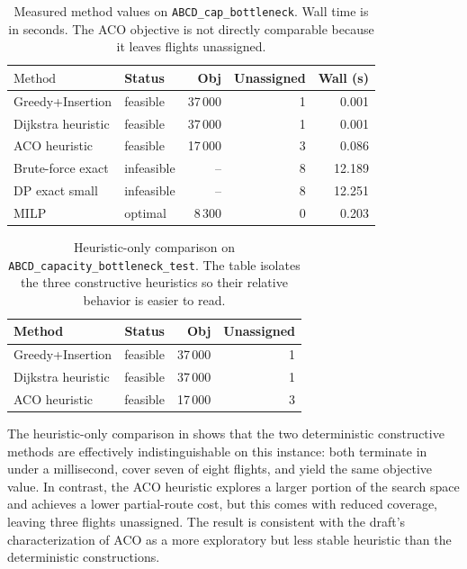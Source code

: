 \begin{table}[t]
\centering\small
\caption{Measured method values on \texttt{ABCD\_cap\_bottleneck}.
  Wall time is in seconds.  The ACO objective is not directly
  comparable because it leaves flights unassigned.}
\label{tab:heu_benchmark}
\begin{tabular}{l l r r r}
\toprule
$\text{Method}$ & Status & Obj & Unassigned & Wall (s) \\
\midrule
Greedy+Insertion & feasible & 37\,000 & 1 & 0.001 \\
Dijkstra heuristic & feasible & 37\,000 & 1 & 0.001 \\
ACO heuristic & feasible & 17\,000 & 3 & 0.086 \\
Brute-force exact & infeasible & -- & 8 & 12.189 \\
DP exact small & infeasible & -- & 8 & 12.251 \\
MILP & optimal & 8\,300 & 0 & 0.203 \\
\bottomrule
\end{tabular}
\end{table}

\begin{table}[t]
\centering\small
\caption{Heuristic-only comparison on
  \texttt{ABCD\_capacity\_bottleneck\_test}.  The table isolates the three
  constructive heuristics so their relative behavior is easier to read.}
\label{tab:heuristic_only}
\begin{tabular}{l r r r}
\toprule
Method & Status & Obj & Unassigned \\
\midrule
Greedy+Insertion & feasible & 37\,000 & 1 \\
Dijkstra heuristic & feasible & 37\,000 & 1 \\
ACO heuristic & feasible & 17\,000 & 3 \\
\bottomrule
\end{tabular}
\end{table}

The heuristic-only comparison in  shows that the two
deterministic constructive methods are effectively indistinguishable on this
instance: both terminate in under a millisecond, cover seven of eight flights,
and yield the same objective value.  In contrast, the ACO heuristic explores a
larger portion of the search space and achieves a lower partial-route cost,
but this comes with reduced coverage, leaving three flights unassigned.  The
result is consistent with the draft's characterization of ACO as a more
exploratory but less stable heuristic than the deterministic constructions.

